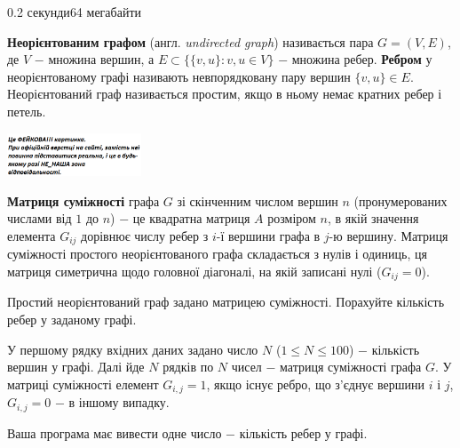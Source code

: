 \begin{problem}{}{}{}{0.2 секунди}{64 мегабайти}

{\bf Неорієнтованим графом} (англ. {\emph{undirected graph}}) називається пара $G=(V,E)$, 
де $V$ $-$ множина вершин, а $E \subset \{\{v,u\}: v,u \in V\}$ $-$ множина ребер.
{\bf Ребром} у неорієнтованому графі називають невпорядковану пару вершин $\{v,u\} \in E$.
Неорієнтований граф називається простим, якщо в ньому немає кратних ребер і петель.

 \begin{center}
    \includegraphics[width=0.30\textwidth,natwidth=232,natheight=217]{pic.png}
  \end{center}

{\bf Матриця суміжності} графа $G$ зі скінченним числом вершин $n$ (пронумерованих числами від $1$ до $n$) $-$ 
це квадратна матриця $A$ розміром $n$, в якій значення елемента $G_{ij}$ дорівнює числу ребер з $i$-ї вершини графа в $j$-ю вершину.
Матриця суміжності простого неорієнтованого графа складається з нулів і одиниць,
ця матриця симетрична щодо головної діагоналі, на якій записані нулі ($G_{ij} = 0$).

Простий неорієнтований граф задано матрицею суміжності. Порахуйте кількість ребер у заданому графі.

\InputFile
У першому рядку вхідних даних задано число $N$ ($1 \le N \le 100$) $-$ кількість вершин у графі.
Далі йде $N$ рядків по $N$ чисел $-$ матриця суміжності графа $G$. У матриці суміжності елемент $G_{i,j}=1$, якщо
існує ребро, що з'єднує вершини $i$ і $j$, $G_{i,j}=0$ $-$ в іншому випадку.

\OutputFile
Ваша програма має вивести одне число $-$ кількість ребер у графі.

\Example

\begin{example}
%
\end{example}

\end{problem}

